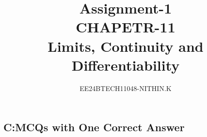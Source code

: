 \documentclass[journal]{IEEEtran}
\numberwithin{equation}{enumi}
\numberwithin{figure}{enumi}
\begin{document}


\title{Assignment-1\\CHAPETR-11\\Limits, Continuity and Differentiability}
\author{EE24BTECH11048-NITHIN.K} 
{\let\newpage\relax\maketitle}


\begin{enumerate}

\section{C:MCQs with One Correct Answer}


\end{enumerate}
\end{document}
